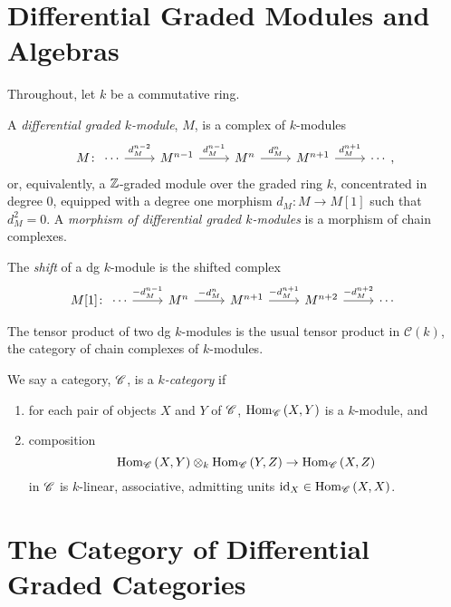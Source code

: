 \documentclass[dissertation.tex]{subfiles}
\begin{document}
\section{Differential Graded Modules and Algebras}
{\noindent Throughout, let $k$ be a commutative ring.}

\begin{defn}
  A {\it differential graded $k$-module}, $M$, is a complex of $k$-modules
  $$M \colon \begin{tikzcd}
    \cdots \arrow{r}{d_M^{n-2}} & M^{n-1} \arrow{r}{d_M^{n-1}} & M^n \arrow{r}{d_M^n} & M^{n+1} \arrow{r}{d_M^{n+1}} & \cdots
  \end{tikzcd},$$
  or, equivalently, a $\mathbb{Z}$-graded module over the graded ring $k$, concentrated in degree 0, equipped with a degree one morphism $d_M : M \rightarrow M[1]$ such that $d_M^2 = 0$.
  A {\it morphism of differential graded $k$-modules} is a morphism of chain complexes.
  
  The {\it shift} of a dg $k$-module is the shifted complex
  $$M[1] \colon \begin{tikzcd}
    \cdots \arrow{r}{-d_M^{n-1}} & M^{n} \arrow{r}{-d_M^{n}} & M^{n+1} \arrow{r}{-d_M^{n+1}} & M^{n+2} \arrow{r}{-d_M^{n+2}} & \cdots
  \end{tikzcd}$$
  
  The tensor product of two dg $k$-modules is the usual tensor product in $\mathcal{C}(k)$, the category of chain complexes of $k$-modules.
\end{defn}

\begin{defn}
  We say a category, $\mathscr{C}$, is a {\it $k$-category} if
  \begin{enumerate}
  \item
    for each pair of objects $X$ and $Y$ of $\mathscr{C}$, $\operatorname{Hom}_{\mathscr{C}}\left(X,Y\right)$ is a $k$-module, and
  \item
    composition 
    $$\operatorname{Hom}_{\mathscr{C}}\left(X,Y\right) \otimes_k \operatorname{Hom}_{\mathscr{C}}\left(Y,Z\right) \rightarrow \operatorname{Hom}_{\mathscr{C}}\left(X,Z\right)$$
    in $\mathscr{C}$ is $k$-linear, associative, admitting units $\operatorname{id}_X \in \operatorname{Hom}_{\mathscr{C}}\left(X,X\right)$.
  \end{enumerate}
\end{defn}

\section{The Category of Differential Graded Categories}
\end{document}
